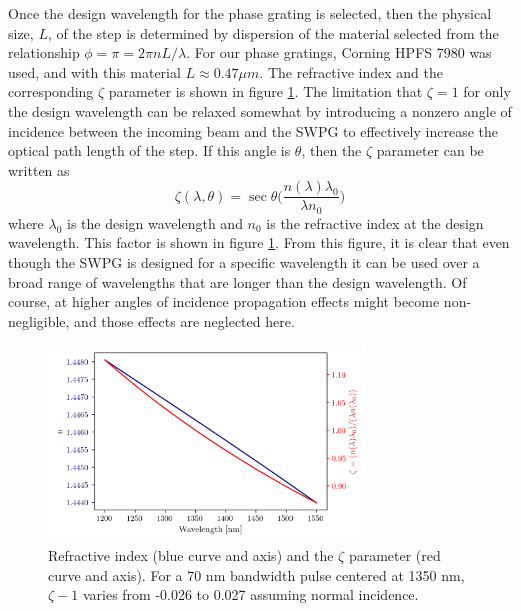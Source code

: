 Once the design wavelength for the phase grating is selected, then the physical size, $L$, of the step is determined by dispersion of the material selected from the relationship $\phi=\pi=2\pi n L/\lambda$.  For our phase gratings, Corning HPFS 7980 was used, and with this material $L\approx0.47\mu m$.  The refractive index and the corresponding $\zeta$ parameter is shown in figure \ref{fig:n_zeta}. The limitation that $\zeta=1$ for only the design wavelength can be relaxed somewhat by introducing a nonzero angle of incidence between the incoming beam and the SWPG to effectively increase the optical path length of the step.  If this angle is $\theta$, then the $\zeta$ parameter can be written as
\begin{equation}
\label{eqn:zeta_theta}
	\zeta(\lambda,\theta)=\sec\theta\bigg(  \frac{n(\lambda)\lambda_0}{\lambda n_0} \bigg)
\end{equation}
where $\lambda_0$ is the design wavelength and $n_0$ is the refractive index at the design wavelength.  This factor is shown in figure \ref{fig:n_zeta}.  From this figure, it is clear that even though the SWPG is designed for a specific wavelength it can be used over a broad range of wavelengths that are longer than the design wavelength. Of course, at higher angles of incidence propagation effects might become non-negligible, and those effects are neglected here. 
\begin{figure}
	\centering
	\includegraphics[width=0.75\textwidth]{figures/Two_source/n_zeta.png}
	\caption{Refractive index (blue curve and axis) and the $\zeta$ parameter (red curve and axis).  For a 70 nm bandwidth pulse centered at 1350 nm, $\zeta - 1$ varies from -0.026 to 0.027 assuming normal incidence.}
	\label{fig:n_zeta}
\end{figure}

